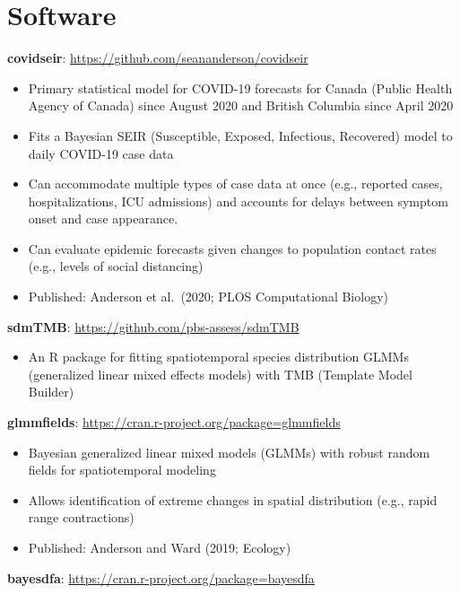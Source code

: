 \hypertarget{software}{%
\section{Software}\label{software}}


\textbf{covidseir}: \url{https://github.com/seananderson/covidseir}

\begin{itemize}
\tightlist
\item
  Primary statistical model for COVID-19 forecasts for Canada (Public
  Health Agency of Canada) since August 2020 and British Columbia since
  April 2020
\item
  Fits a Bayesian SEIR (Susceptible, Exposed, Infectious, Recovered)
  model to daily COVID-19 case data
\item
  Can accommodate multiple types of case data at once (e.g., reported
  cases, hospitalizations, ICU admissions) and accounts for delays
  between symptom onset and case appearance.
\item
  Can evaluate epidemic forecasts given changes to population contact
  rates (e.g., levels of social distancing)
\item
  Published: Anderson et al.\ (2020; PLOS Computational Biology)
\end{itemize}

\textbf{sdmTMB}: \url{https://github.com/pbs-assess/sdmTMB}

\begin{itemize}
\tightlist
\item
  An R package for fitting spatiotemporal species distribution GLMMs
  (generalized linear mixed effects models) with TMB (Template Model
  Builder)
\end{itemize}

\textbf{glmmfields}: \url{https://cran.r-project.org/package=glmmfields}

\begin{itemize}
\tightlist
\item
  Bayesian generalized linear mixed models (GLMMs) with robust random
  fields for spatiotemporal modeling
\item
  Allows identification of extreme changes in spatial distribution
  (e.g., rapid range contractions)
\item
  Published: Anderson and Ward (2019; Ecology)
\end{itemize}

\textbf{bayesdfa}: \url{https://cran.r-project.org/package=bayesdfa}

